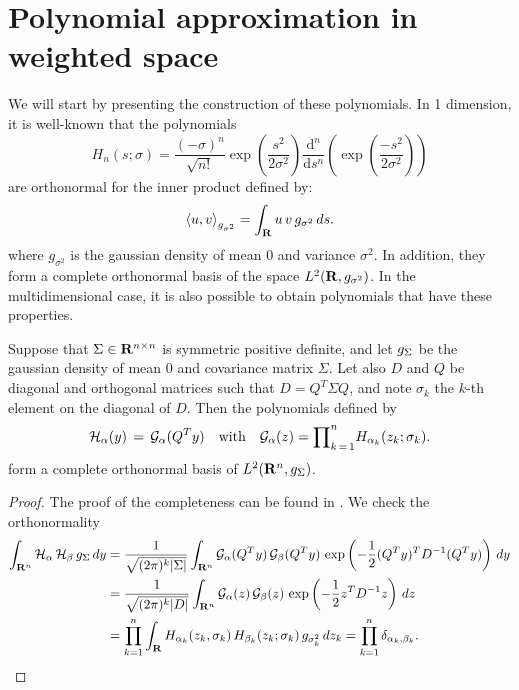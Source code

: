 \section{Polynomial approximation in weighted space}
We will start by presenting the construction of these polynomials. In 1
dimension, it is well-known that the polynomials 
\begin{equation}
    H_n(s; \sigma) = \frac{(-\sigma)^n}{\sqrt{n!}}
    \exp\left({\frac{s^2}{2\sigma^2}}\right)\frac{\mathrm d ^n}{\mathrm d
    s^n}\left(\exp{\left(\frac{-s^2}{2\sigma^2}\right)}\right)
    \label{Hermite polynomials in 1 dimension}
\end{equation}
are orthonormal for the inner product defined by:
$$ \left \langle u, v \right \rangle_{g_{\sigma^2}} = \int_{\mathbf R} u \, v \, g_{\sigma^2} \, ds. $$
where $g_{\sigma^2}$ is the gaussian density of mean 0 and variance $\sigma^2$.
In addition, they form a complete orthonormal basis of the space $L^2(\mathbf R,
g_{\sigma^2})$. In the multidimensional case, it is also possible to obtain
polynomials that have these properties.
\begin{lemma}
   Suppose that $\Sigma \in \mathbf R^{n\times n}$ is symmetric positive definite,
   and let $g_{\Sigma}$ be the gaussian density of mean $0$ and covariance
   matrix $\Sigma$. Let also $D$ and $Q$ be diagonal and orthogonal matrices
   such that $D = Q^T \Sigma Q$, and note $\sigma_k$ the $k$-th element on the
   diagonal of $D$. Then the polynomials defined by
    \begin{equation}
        \mathcal H_{\alpha}(y)\,=\, \mathcal G_{\alpha} (Q^T y) \quad \text{with}
        \quad \mathcal G_\alpha(z)={\prod}_{k\,=\,1}^n H_{\alpha_k}(z_k; \sigma_k).
        \label{eq: Definition of modified Hermite polynomials}
    \end{equation}
    form a complete orthonormal basis of $L^2(\mathbf R^n, g_{\Sigma})$.
\end{lemma}
\iflong \begin{proof}
    The proof of the completeness can be found in \cite{andrews2000special}.
    We check the orthonormality 
    \begin{align*}
    \int_{\mathbf R^n} \mathcal H_\alpha \, \mathcal H_\beta \, g_{\Sigma}
    \, dy &= \frac{1}{\sqrt{(2\pi)^k| \Sigma|}}\int_{\mathbf R^n}\mathcal G_\alpha
    (Q^T y) \,\mathcal G_\beta (Q^T y) \,
    \exp\left(-\frac{1}{2}(Q^Ty)^T D^{-1} (Q^Ty) \right) \, dy  \\
    &=  \frac{1}{\sqrt{(2\pi)^k| D|}}\int_{\mathbf R^n}\mathcal G_\alpha (z)
    \,\mathcal G_\beta (z) \,  \exp\left(-\frac{1}{2}z^T D^{-1}z \right) \, dz
    \\ &= \prod_{k=1}^n \int_{\mathbf R} H_{\alpha_k}(z_k,\sigma_k) \,
    H_{\beta_k}(z_k; \sigma_k) \, g_{\sigma_k^2} \, dz_k = \prod_{k=1}^n
    \delta_{\alpha_k,\beta_k}.
    \end{align*}
\end{proof} \fi
